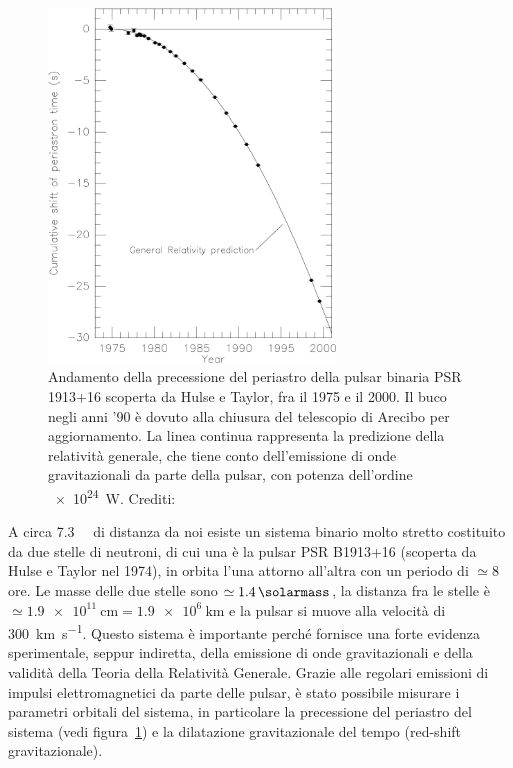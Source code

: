 \begin{figure}
  \centering
  \includegraphics[width=0.68\textwidth]{figure/hulse-taylor-grav-wave}
  \caption{Andamento della precessione del periastro della pulsar binaria PSR
    1913+16 scoperta da Hulse e Taylor, fra il 1975 e il 2000.  Il buco negli
    anni '90 è dovuto alla chiusura del telescopio di Arecibo per aggiornamento.
    La linea continua rappresenta la predizione della relatività generale, che
    tiene conto dell'emissione di onde gravitazionali da parte della pulsar, con
    potenza dell'ordine \SI{e24}{\watt}.  Crediti:
    \textcite{2001LRR.....4....4W}}
  \label{fig:hulse-taylor-grav-wave}
\end{figure}
A circa \SI{7.3}{\kilo\parsec} di distanza da noi esiste un sistema binario
molto stretto costituito da due stelle di neutroni, di cui una è la pulsar PSR
B1913+16 (scoperta da Hulse e Taylor nel 1974), in orbita l'una attorno
all'altra con un periodo di $\simeq 8$ ore.  Le masse delle due stelle sono
$\simeq \SI{1.4}{\solarmass}$, la distanza fra le stelle è
$\simeq \SI{1.9e11}{\centi\metre} = \SI{1.9e6}{\kilo\metre}$ e la pulsar si
muove alla velocità di \SI{300}{\kilo\metre\per\second}.  Questo sistema è
importante perché fornisce una forte evidenza sperimentale, seppur indiretta,
della emissione di onde gravitazionali e della validità della Teoria della
Relatività Generale.  Grazie alle regolari emissioni di impulsi elettromagnetici
da parte delle pulsar, è stato possibile misurare i parametri orbitali del
sistema, in particolare la precessione del periastro del sistema (vedi
figura~\ref{fig:hulse-taylor-grav-wave}) e la dilatazione gravitazionale del
tempo (red-shift gravitazionale).


